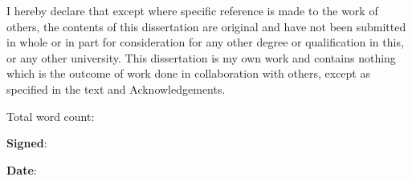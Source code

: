 
\begin{declaration}

I hereby declare that except where specific reference is made to the work of
others, the contents of this dissertation are original and have not been
submitted in whole or in part for consideration for any other degree or
qualification in this, or any other university. This dissertation is my own
work and contains nothing which is the outcome of work done in collaboration
with others, except as specified in the text and Acknowledgements.


\vspace{24pt}
Total word count: \wordcount

\vspace{60pt}
\textbf{Signed}:

\vspace{12pt}
\textbf{Date}:



\end{declaration}

